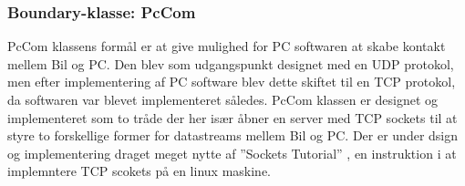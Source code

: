 \subsubsection{Boundary-klasse: PcCom} \label{sec:pccom}
PcCom klassens formål er at give mulighed for PC softwaren at skabe kontakt mellem Bil og PC. Den blev som udgangspunkt designet med en UDP protokol, men efter implementering af PC software blev dette skiftet til en TCP protokol, da softwaren var blevet implementeret således. PcCom klassen er designet og implementeret som to tråde der her især åbner en server med TCP sockets til at styre to forskellige former for datastreams mellem Bil og PC. Der er under dsign og implementering draget meget nytte af ''Sockets Tutorial'' \cite{lib:socket_tutorial}, en instruktion i at implemntere TCP scokets på en linux maskine.